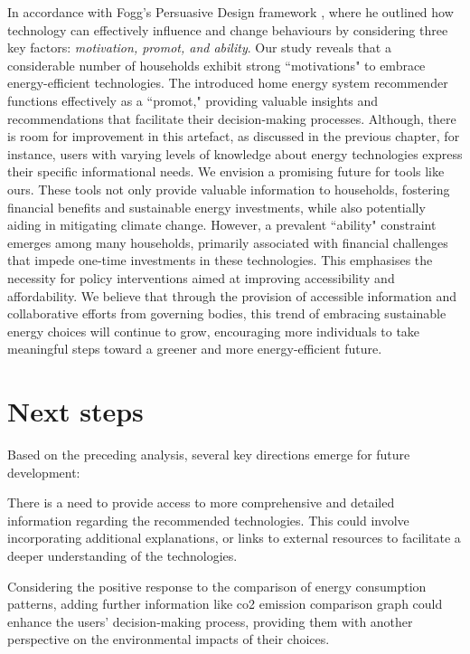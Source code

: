 In accordance with Fogg's Persuasive Design framework \cite{Fogg2009}, 
where he outlined how technology can effectively influence and change behaviours by considering three key factors: 
\emph{motivation, promot, and ability}. 
Our study reveals that a considerable number of households exhibit strong ``motivations" to embrace energy-efficient technologies. 
The introduced home energy system recommender functions effectively as a ``promot," providing valuable insights and recommendations that facilitate their decision-making processes. 
Although, there is room for improvement in this artefact, as discussed in the previous chapter,
for instance, users with varying levels of knowledge about energy technologies express their specific informational needs.
We envision a promising future for tools like ours.
These tools not only provide valuable information to households, fostering financial benefits and sustainable energy investments, while also potentially aiding in mitigating climate change. 
However, a prevalent ``ability" constraint emerges among many households,
primarily associated with financial challenges that impede one-time investments in these technologies. 
This emphasises the necessity for policy interventions aimed at improving accessibility and affordability. 
We believe that through the provision of accessible information and collaborative efforts from governing bodies, this trend of embracing sustainable energy choices will continue to grow, encouraging more individuals to take meaningful steps toward a greener and more energy-efficient future.  


\section{Next steps}

Based on the preceding analysis, several key directions emerge for future development:

There is a need to provide access to more comprehensive and detailed information regarding the recommended technologies. 
This could involve incorporating additional explanations, or links to external resources to facilitate a deeper understanding of the technologies.

Considering the positive response to the comparison of energy consumption patterns, adding further information like \gls{co2} emission comparison graph could enhance the users' decision-making process, providing them with another perspective on the environmental impacts of their choices.

